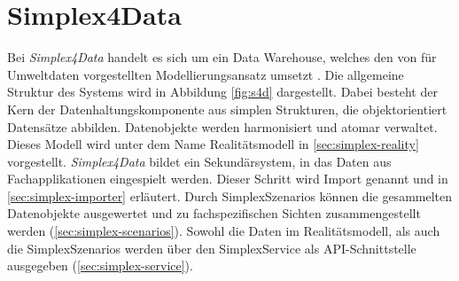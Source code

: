 \newcommand{\SimplexData}{\textit{Simplex4Data}}
\section{Simplex4Data}

Bei \SimplexData{} handelt es sich um ein Data Warehouse, welches den von \textcite{rudolfUmweltdatenmanagementGeoInspiration2018} für Umweltdaten vorgestellten Modellierungsansatz umsetzt \parencite{grossmannFachsystemeSchemaevolution2024}. Die allgemeine Struktur des Systems wird in Abbildung \ref{fig:s4d} dargestellt. Dabei besteht der Kern der Datenhaltungskomponente aus simplen Strukturen, die objektorientiert Datensätze abbilden. Datenobjekte werden harmonisiert und atomar verwaltet. Dieses Modell wird unter dem Name Realitätsmodell in \ref{sec:simplex-reality} vorgestellt. \SimplexData{} bildet ein Sekundärsystem, in das Daten aus Fachapplikationen eingespielt werden. Dieser Schritt wird Import genannt und in \ref{sec:simplex-importer} erläutert. Durch SimplexSzenarios können die gesammelten Datenobjekte ausgewertet und zu fachspezifischen Sichten zusammengestellt werden (\ref{sec:simplex-scenarios}). Sowohl die Daten im Realitätsmodell, als auch die SimplexSzenarios werden über den SimplexService als \acs{API}-Schnittstelle ausgegeben (\ref{sec:simplex-service}).

